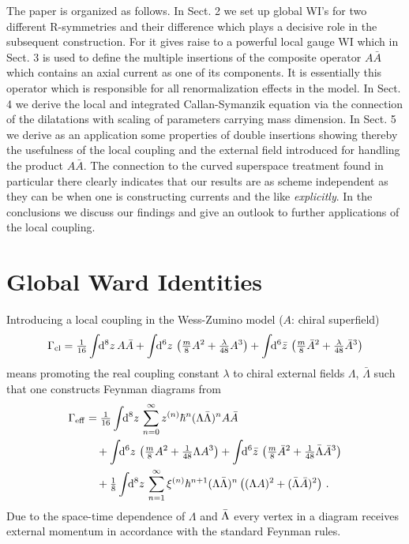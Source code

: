 \documentclass[a4paper,12pt]{article}
\newcommand{\dS}{\!\!{\rm d}^6z\,}
\newcommand{\dSb}{\!\!{\rm d}^6\bar z\,}
\newcommand{\dV}{\!\!{\rm d}^8z\,}
\newcommand{\Geff}{\Gamma_{\rm eff}}
\newcommand{\Gcl}{\Gamma_{\rm cl}}
\newcommand{\tfr}[2]{{\textstyle \frac{#1}{#2}}}
\begin{document}
The paper is organized as follows. In Sect. 2 we set up global
WI's for two different R-symmetries and their difference which
plays a decisive role in the subsequent construction. For it
gives raise to a powerful local gauge WI which in Sect. 3
is used to define the multiple insertions of the composite
operator $A\bar A$ which contains an axial current as one
of its components. It is essentially this operator which is
responsible for all renormalization effects in the model.
In Sect. 4 we derive the local and integrated Callan-Symanzik equation
via the connection of the dilatations with scaling of
parameters carrying mass dimension. In Sect. 5 we
derive as an application some properties of double
insertions showing thereby the usefulness of the local
coupling and the external field introduced for handling
the product $A\bar A$. The connection to the curved superspace
treatment found in particular there clearly indicates that our results are
as scheme independent as they can be when one is
constructing currents and the like {\sl explicitly}. 
In the conclusions we discuss
our findings and give an outlook to further applications
of the local coupling.


\section{Global Ward Identities} \label{sec:GlobalWI}
\setcounter{equation}{0}

Introducing a local coupling in the Wess-Zumino model ($A$: chiral
superfield)
\begin{equation}
\Gcl = \tfr{1}{16} \int \dV A \bar A + \int \dS \left(\tfr{m}{8} A^2 +
  \tfr{\lambda}{48} A^3 \right) 
 + \int \dSb \left(\tfr{m}{8} \bar A^2 +   \tfr{\lambda}{48} \bar A^3 \right) 
\end{equation}
means promoting the real coupling constant $\lambda$ to chiral
external fields
$\Lambda$, $\bar\Lambda$ such that one constructs Feynman diagrams from
\begin{align}
\Geff &= \tfr{1}{16} \int \dV \sum_{n=0}^\infty z^{(n)} \hbar^n
(\Lambda\Bar\Lambda)^n A \bar A \nonumber  \\
&\quad + \int \dS \left( \tfr{m}{8} A^2 + \tfr{1}{48} \Lambda A^3 \right) 
 + \int \dSb \left(\tfr{m}{8} \bar A^2 +   \tfr{1}{48} \bar \Lambda \bar A^3
 \right) 
\nonumber \\
&\quad + \tfr{1}{8} \int \dV \sum_{n=1}^\infty \xi^{(n)} \hbar^{n+1}
(\Lambda \bar\Lambda)^n \left( (\Lambda A)^2 + (\bar\Lambda \bar A)^2
\right) \,.
\end{align}
Due to the space-time dependence of $\Lambda$ and $\Bar\Lambda$
every vertex in a diagram receives external momentum in accordance
with the standard Feynman rules.  
\end{document}

